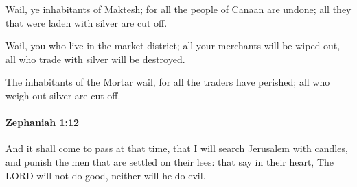 			\begin{versebox}
					\item[BHS] 
					\item[LXX] 
					\item[ASV] Wail, ye inhabitants of Maktesh; for all the people of Canaan are undone; all they that were laden with silver are cut off.
					\item[NIV] Wail, you who live in the market district; all your merchants will be wiped out, all who trade with silver will be destroyed.
					\item[NRSV] The inhabitants of the Mortar wail, for all the traders have perished; all who weigh out silver are cut off.
			\end{versebox}

		\paragraph{Zephaniah 1:12} %
			\label{ZEPHANIAH-1-12}

			And it shall come to pass at that time, that I will search Jerusalem with candles, and punish the men that are settled on their lees: that say in their heart, The LORD will not do good, neither will he do evil.

